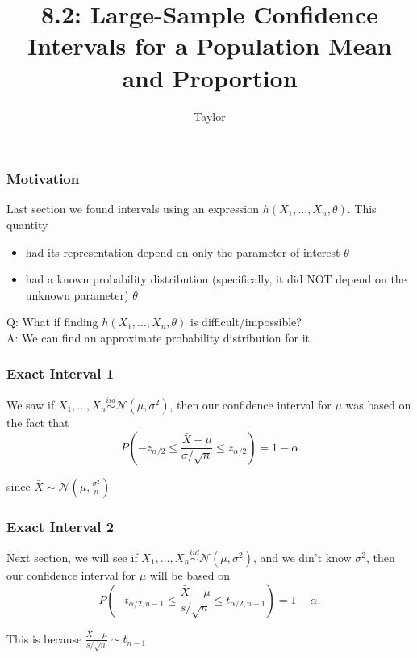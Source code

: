 \documentclass{beamer}
\title["8.2"]{8.2: Large-Sample Confidence Intervals for a Population Mean and Proportion}
\author{Taylor}
\institute[UVA] 
{
University of Virginia \\
\medskip
\textit{} 
}
\date{}
\begin{document}

\begin{frame}
\titlepage 
\end{frame}
\begin{frame}
\frametitle{Motivation}

Last section we found intervals using an expression $h(X_1, \ldots, X_n, \theta)$. This quantity 

\begin{itemize}
\item had its representation depend on only the parameter of interest $\theta$
\item had a known probability distribution (specifically, it did NOT depend on the unknown parameter) $\theta$
\end{itemize}

Q: What if finding  $h(X_1, \ldots, X_n, \theta)$ is difficult/impossible?\\
A: We can find an approximate probability distribution for it.
\end{frame}

\begin{frame}
\frametitle{Exact Interval 1}

We saw if $X_1, \ldots, X_n \overset{iid}{\sim} \mathcal{N}(\mu, \sigma^2)$, then our confidence interval for $\mu$ was based on the fact that
\[
P( - z_{\alpha/2} \le \frac{\bar{X} - \mu}{\sigma / \sqrt{n}} \le z_{\alpha/2}) = 1-\alpha
\]

since $\bar{X} \sim \mathcal{N}(\mu, \frac{\sigma^2}{n})$

\end{frame}

\begin{frame}
\frametitle{Exact Interval 2}

Next section, we will see if $X_1, \ldots, X_n \overset{iid}{\sim} \mathcal{N}(\mu, \sigma^2)$, and we din't know $\sigma^2$, then our confidence interval for $\mu$ will be based on 
\[
P\left( - t_{\alpha/2,n-1} \le \frac{\bar{X} - \mu}{s / \sqrt{n}} \le t_{\alpha/2,n-1}\right) = 1-\alpha.
\]
\newline

This is because $\frac{\bar{X} - \mu }{s / \sqrt{n}} \sim t_{n-1}$

\end{frame}
\end{document}
